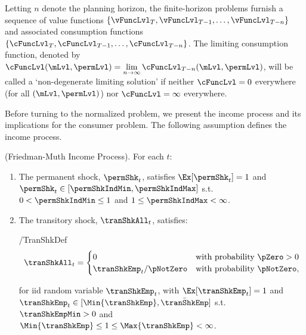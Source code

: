 \documentclass[BufferStockTheory]{subfiles}
\begin{document}
Letting $n$ denote the planning horizon, the finite-horizon problems furnish a sequence of value functions $\{\vFuncLvl_{T},\vFuncLvl_{T-1},\ldots,\vFuncLvl_{T-n}\}$ and associated consumption functions $\{\cFuncLvl_{T},\cFuncLvl_{T-1},\ldots,\cFuncLvl_{T-n}\}$.
The limiting consumption function, denoted by $\usual{\cFuncLvl}(\mLvl,\permLvl) = \lim\limits_{n \rightarrow \infty} \cFuncLvl_{T-n}(\mLvl,\permLvl)$, will be called a `non-degenerate limiting solution' if  neither $\usual{\cFuncLvl}=0$ everywhere (for all $(\mLvl,\permLvl)$) nor $\usual{\cFuncLvl}=\infty$ everywhere.

Before turning to the normalized problem, we present the income process and its implications for the consumer problem.
The following assumption defines the income process.

\begin{assumI}\label{ass:shocks}(Friedman-Muth Income Process).
For each $t$:
\begin{enumerate}
\item The permanent shock, $\permShk_{t}$, satisfies $\Ex[{\permShk}_{t}]=1$ and  $\permShk_{t}\in [\permShkIndMin,\permShkIndMax]$ s.t. $0 < \permShkIndMin \leq 1$ and $1 \leq \permShkIndMax < \infty$. 
\item The transitory shock, $\tranShkAll_{t}$, satisfies: 
\begin{verbatimwrite}{\EqDir/TranShkDef}
  \begin{equation}
    \tranShkAll_{t}=
    \begin{cases}
      0\phantom{_{t+1}/\pNotZero} & \text{with probability $\pZero > 0$} \\
      \tranShkEmp_{t}/\pNotZero      & \text{with probability $\pNotZero  $}, %
    \end{cases} \label{eq:TranShkDef}
  \end{equation}
\end{verbatimwrite}\unskip

\noindent for iid random variable $\tranShkEmp_{t}$,  with $\Ex[{\tranShkEmp}_{t}]=1$ and $ \tranShkEmp_{t} \in [\Min{\tranShkEmp}, \bar{\tranShkEmp}]$ s.t.
$\tranShkEmpMin >0$ and $\Min{\tranShkEmp} \leq 1 \leq \Max{\tranShkEmp} < \infty$.

\end{enumerate} 
\end{assumI}
\end{document}
